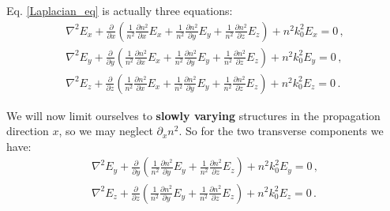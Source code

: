 \documentclass[]{article}
\begin{document}
	Eq. \eqref{Laplacian_eq} is actually three equations:
	\begin{subequations}
		\begin{align}
			\nabla^2 E_x + \frac{\partial}{\partial x}\left(\frac{1}{n^2}\frac{\partial n^2}{\partial x} E_x+\frac{1}{n^2}\frac{\partial n^2}{\partial y} E_y+\frac{1}{n^2}\frac{\partial n^2}{\partial z} E_z \right)+n^2 k_0^2 E_x = 0\, ,\\ 
			\nabla^2 E_y + \frac{\partial}{\partial y}\left(\frac{1}{n^2}\frac{\partial n^2}{\partial x} E_x+\frac{1}{n^2}\frac{\partial n^2}{\partial y} E_y+\frac{1}{n^2}\frac{\partial n^2}{\partial z} E_z \right)+n^2 k_0^2 E_y = 0\, ,\\
			\nabla^2 E_z + \frac{\partial}{\partial z}\left(\frac{1}{n^2}\frac{\partial n^2}{\partial x} E_x+\frac{1}{n^2}\frac{\partial n^2}{\partial y} E_y+\frac{1}{n^2}\frac{\partial n^2}{\partial z} E_z \right)+n^2 k_0^2 E_z = 0\, .
		\end{align}
	\end{subequations}
	
	We will now limit ourselves to \textbf{slowly varying} structures in the propagation direction $x$, so we may neglect $\partial_x n^2$. So for the two transverse components we have:
	\begin{subequations}
		\begin{align}
			\nabla^2 E_y + \frac{\partial}{\partial y}\left(\frac{1}{n^2}\frac{\partial n^2}{\partial y} E_y+\frac{1}{n^2}\frac{\partial n^2}{\partial z} E_z \right)+n^2 k_0^2 E_y = 0\, ,\\ 
			\nabla^2 E_z + \frac{\partial}{\partial z}\left(\frac{1}{n^2}\frac{\partial n^2}{\partial y} E_y+\frac{1}{n^2}\frac{\partial n^2}{\partial z} E_z \right)+n^2 k_0^2 E_z = 0\, .
		\end{align}
		\label{main_eqs}
	\end{subequations}
	
	
\end{document}
